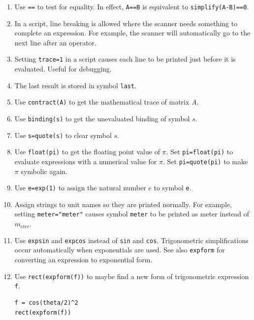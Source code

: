\documentclass[12pt]{article}
\begin{document}
\begin{enumerate}

\item
Use \verb$==$ to test for equality.
In effect, \verb$A==B$ is equivalent to \verb$simplify(A-B)==0$.

\item
In a script, line breaking is allowed where the scanner needs something to complete an expression.
For example, the scanner will automatically go to the next line after an operator.

\item
Setting \verb$trace=1$ in a script causes each line to be printed just before it is evaluated.
Useful for debugging.

\item
The last result is stored in symbol \verb$last$.

\item
Use \verb$contract(A)$ to get the mathematical trace of matrix $A$.

\item
Use \verb$binding(s)$ to get the unevaluated binding of symbol $s$.

\item
Use \verb$s=quote(s)$ to clear symbol $s$.

\item
Use \verb$float(pi)$ to get the floating point value of $\pi$.
Set \verb$pi=float(pi)$ to evaluate expressions with a numerical value for $\pi$.
Set \verb$pi=quote(pi)$ to make $\pi$ symbolic again.

\item
Use \verb$e=exp(1)$ to assign the natural number $e$ to symbol \verb$e$.

\item
Assign strings to unit names so they are printed normally.
For example, setting \verb$meter="meter"$ causes symbol \verb$meter$
to be printed as meter instead of $m_{eter}$.

\item
Use \verb$expsin$ and \verb$expcos$ instead of \verb$sin$ and \verb$cos$.
Trigonometric simplifications occur automatically when exponentials are used.
See also \verb$expform$ for converting an expression to exponential form.

\item
Use \verb$rect(expform(f))$ to maybe find a new form
of trigonometric expression \verb$f$.

{\color{blue}
\begin{verbatim}
f = cos(theta/2)^2
rect(expform(f))
\end{verbatim}}


\end{enumerate}
\end{document}
